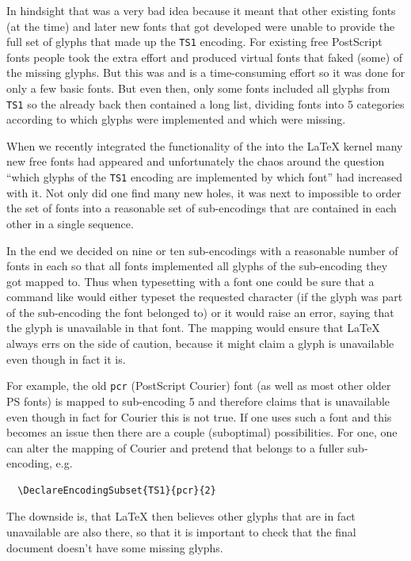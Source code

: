 \documentclass{ltnews}
\begin{document}
In hindsight that was a very bad idea because it meant that other
existing fonts (at the time) and later new fonts that got developed
were unable to provide the full set of glyphs that made up the
\texttt{TS1} encoding. For existing free PostScript fonts people 
took the extra effort and produced virtual fonts that faked (some) of
the missing glyphs. But this was and is a time-consuming effort so it
was done for only a few basic fonts. But even then, only some fonts
included all glyphs from \texttt{TS1} so the  already
back then contained a long list, dividing fonts into 5 categories
according to which glyphs were implemented and which were missing.


When we recently integrated the functionality of the 
into the \LaTeX{} kernel
many new free fonts had appeared and
unfortunately the chaos around the question \enquote{which glyphs of
  the \texttt{TS1} encoding are implemented by which font} had
increased with it. Not only did one find many new holes, it was next to
impossible to order the set of fonts into a reasonable set of
sub-encodings that are contained in each other in a single sequence.

In the end we decided on nine or ten sub-encodings with a reasonable
number of fonts in each so that all fonts implemented all glyphs of the
sub-encoding they got mapped to. Thus when typesetting with a font one
could be sure that a command like  would either
typeset the requested character (if the glyph was part of the
sub-encoding the font belonged to) or it would raise an error, saying
that the glyph is unavailable in that font.  The mapping would ensure
that \LaTeX{} always errs on the side of caution, because it might
claim a glyph is unavailable even though in fact it is.

For example, the old \texttt{pcr} (PostScript Courier) font (as well
as most other older PS fonts) is mapped to sub-encoding 5 and
therefore claims that  is unavailable even though
in fact for Courier this is not true. If one uses such a font and this
becomes an issue then there are a couple (suboptimal) possibilities.
For one, one can alter the mapping of Courier and pretend that belongs
to a fuller sub-encoding, e.g.
\begin{verbatim}
  \DeclareEncodingSubset{TS1}{pcr}{2}
\end{verbatim}
The downside is, that \LaTeX{} then believes other glyphs that are in fact
unavailable are also there, so that it is important to check that the
final document doesn't have some missing glyphs.
\end{document}
